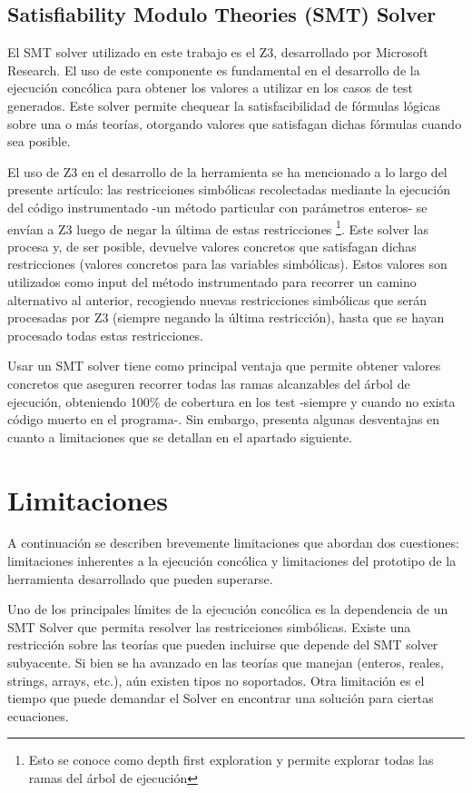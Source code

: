 \documentclass{llncs}
\begin{document}
\subsection{Satisfiability Modulo Theories (SMT) Solver}
El SMT solver utilizado en este trabajo es el Z3, desarrollado por Microsoft Research. El uso de este componente es fundamental en el desarrollo
de la ejecución concólica para obtener los valores a utilizar en los casos de test generados. Este solver permite chequear la satisfacibilidad
de fórmulas lógicas sobre una o más teorías, otorgando valores que satisfagan dichas fórmulas cuando sea posible.

El uso de Z3 en el desarrollo de la herramienta se ha mencionado a lo largo del presente artículo: las restricciones simbólicas recolectadas mediante
la ejecución del código instrumentado -un método particular con parámetros enteros- se envían a Z3 luego de negar la última de estas
restricciones \footnote{Esto se conoce como depth first exploration y permite explorar todas las ramas del árbol de ejecución}. Este solver las procesa y,
de ser posible, devuelve valores concretos que satisfagan dichas restricciones (valores concretos para las variables simbólicas). Estos valores son
utilizados como input del método instrumentado para recorrer un camino alternativo al anterior, recogiendo nuevas restricciones simbólicas que serán
procesadas por Z3 (siempre negando la última restricción), hasta que se hayan procesado todas estas restricciones.

Usar un SMT solver tiene como principal ventaja que permite obtener valores concretos que aseguren recorrer todas las ramas alcanzables del árbol de ejecución,
obteniendo 100\% de cobertura en los test -siempre y cuando no exista código muerto en el programa-. Sin embargo, presenta algunas desventajas en cuanto a
limitaciones que se detallan en el apartado siguiente.

\section{Limitaciones}
A continuación se describen brevemente limitaciones que abordan dos cuestiones: limitaciones inherentes a la ejecución concólica y limitaciones
del prototipo de la herramienta desarrollado que pueden superarse.

Uno de los principales límites de la ejecución concólica es la dependencia de un SMT Solver que permita resolver las restricciones simbólicas.
Existe una res\-tric\-ción sobre las teorías que pueden incluirse que depende del SMT solver subyacente. Si bien se ha avanzado en las teorías
que manejan (enteros, reales, strings, arrays, etc.), aún existen tipos no soportados. Otra limitación es el tiempo que puede demandar el
Solver en encontrar una solución para ciertas ecuaciones.
\end{document}
